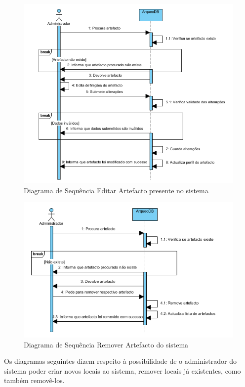 \documentclass[12pt,a4paper]{article}
\begin{document}
\begin{figure}[h!]
\centering
\includegraphics[scale=1]{sequencia/A_editarartefacto}
\caption{Diagrama de Sequência Editar Artefacto presente no sistema} 
\end{figure}  

\begin{figure}[h!]
\centering
\includegraphics[scale=1]{sequencia/A_removerartefacto}
\caption{Diagrama de Sequência Remover Artefacto do sistema} 
\end{figure}  
  
  
\clearpage
Os diagramas seguintes dizem respeito à possibilidade de o administrador do sistema poder criar novos locais ao sistema, remover locais já existentes, como também removê-los.\\
\end{document}
